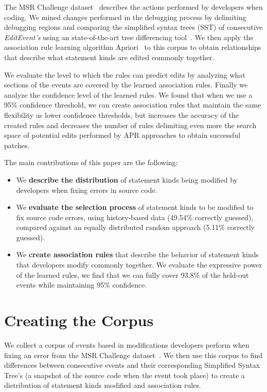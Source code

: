 \documentclass[sigconf]{acmart}
\begin{document}
The MSR Challenge dataset~\cite{msr18challenge}
describes the actions performed
by developers when coding.
We mined changes performed in the debugging
process by delimiting debugging regions
and comparing the simplified syntax
trees (SST) of consecutive \textit{EditEvent's} using an 
state-of-the-art tree differencing tool~\cite{Pawlik16Apted}.
We then apply the association
rule learning algorithm Apriori~\cite{Agrawal94} to this corpus
to obtain relationships that describe what statement kinds
are edited commonly together.

We evaluate the level to which the rules can predict edits
by analyzing what sections of the events are covered by the 
learned association rules. 
Finally we analyze
the confidence level of the learned rules. 
We found that when we use a 95\% confidence
threshold, we can create association
rules that maintain the same flexibility as 
lower confidence thresholds, but increases
the accuracy of the created rules and decreases the number of rules
delimiting even more the search space of potential edits
performed by APR approaches to obtain successful patches.

The main contributions of this paper are the following:
\begin{itemize}
\item We \textbf{describe the distribution} of statement kinds being
modified by developers when fixing errors in source code. 

\item We \textbf{evaluate
the selection process} of statement kinds to be modified
to fix source code errors, using history-based data (49.54\% correctly guessed), compared against
an equally distributed random approach (5.11\% correctly guessed).

\item We \textbf{create association rules} that describe the behavior
of statement kinds that developers modify commonly together. 
We evaluate the expressive power of the learned rules, we find
that we can fully cover 93.8\% of the held-out events while maintaining
95\% confidence.

\end{itemize}

\section{Creating the Corpus}

We collect a corpus of events based in modifications 
developers perform when fixing an error from the MSR Challenge 
dataset~\cite{msr18challenge}. We then
use this corpus to find differences between consecutive events
and their corresponding Simplified Syntax Tree's (a snapshot of
the source code when the event took place) to create a distribution 
of statement kinds modified and association rules.
\end{document}
